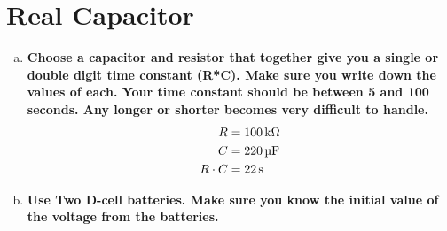 \documentclass[article, 12pt]{article}
\begin{document}
    \section{Real Capacitor}
    \begin{enumerate}[a)]
        \item \textbf{Choose a capacitor and resistor that together give you a single or double digit time constant (R*C). Make sure you write down the values of each. Your time constant should be between 5 and 100 seconds. Any longer or shorter becomes very difficult to handle.}
        \begin{align}
            R &= \text{\SI{100}{\kilo\ohm}}\\
            C &= \text{\SI{220}{\micro\farad}}\\
            R \cdot C &= \text{\SI{22}{\second}}
        \end{align}
        \item \textbf{Use Two D-cell batteries. Make sure you know the initial value of the voltage from the batteries.}
        

\end{enumerate}
\end{document}
